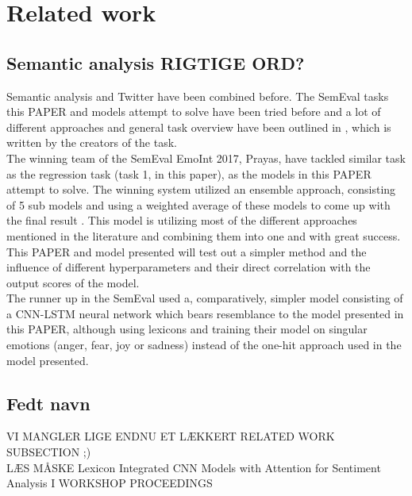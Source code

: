 
\section{Related work}

\subsection{Semantic analysis RIGTIGE ORD?}

Semantic analysis and Twitter have been combined before. The SemEval tasks this PAPER and models attempt to solve have been tried before and a lot of different approaches and general task overview have been outlined in \cite{wassa2017}, which is written by the creators of the task.\\
The winning team of the SemEval EmoInt 2017, Prayas, have tackled similar task as the regression task (task 1, in this paper), as the models in this PAPER attempt to solve. The winning system utilized an ensemble approach, consisting of 5 sub models and using a weighted average of these models to come up with the final result \cite{prayas}. This model is utilizing most of the different approaches mentioned in the literature and combining them into one and with great success. This PAPER and model presented will test out a simpler method and the influence of different hyperparameters and their direct correlation with the output scores of the model.\\
The runner up in the SemEval used a, comparatively, simpler model consisting of a CNN-LSTM neural network which bears resemblance to the model presented in this PAPER, although using lexicons and training their model on singular emotions (anger, fear, joy or sadness) instead of the one-hit approach used in the model presented.\\

\subsection{Fedt navn}

VI MANGLER LIGE ENDNU ET LÆKKERT RELATED WORK SUBSECTION ;)\\
LÆS MÅSKE Lexicon Integrated CNN Models with Attention for Sentiment Analysis I WORKSHOP PROCEEDINGS